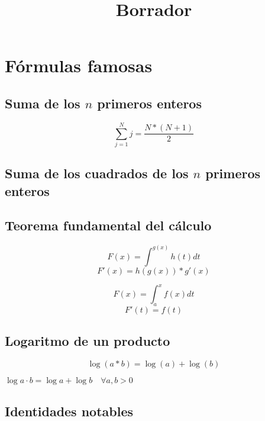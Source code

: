 \documentclass{article}
\author{}
\date{}
\title{Borrador}
\begin{document}
\maketitle


\begin{abstract}

\end{abstract}

\section{F\'ormulas famosas}

\subsection{Suma de los $n$ primeros enteros}
\[\sum_{j=1}^{N}j=\frac{N*(N+1)}{2}\]

\subsection{Suma de los cuadrados de los $n$ primeros enteros}


\subsection{Teorema fundamental del cálculo}


\begin{equation} F(x)=\int^{g(x)} h(t) dt \end{equation}
\begin{equation} F'(x)=h(g(x))*g'(x) \end{equation}


\[F(x) = \int_a^xf(x)dt\]
\[F'(t)=f(t)\]

\subsection{Logaritmo de un producto}

\begin{equation}\log(a*b)=\log(a)+\log(b)\end{equation}

$\log a·b = \log a + \log b\quad \forall a,b > 0$\label{form_log}

\subsection{Identidades notables}
\end{document}
